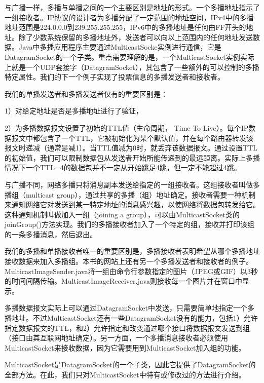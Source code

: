 		与广播一样，多播与单播之间的一个主要区别是地址的形式。一个多播地址指示了一组接收者。IP协议的设计者为多播分配了一定范围的地址空间，IPv4中的多播地址范围是224.0.0.0到239.255.255.255，IPv6中的多播地址是任何由FF开头的地址。除了少数系统保留的多播地址外，发送者可以向以上范围内的任何地址发送数据。Java中多播应用程序主要通过MulticastSocke实例进行通信，它是DatagramSocket的一个子类。重点需要理解的是，一个MulticastSocket实例实际上就是一个UDP套接字（DatagramSocket），其包含了一些额外的可以控制的多播特定属性。我们的下一个例子实现了投票信息的多播发送者和接收者。 

		

		我们的单播发送者和多播发送者仅有的重要区别是：

		1）对给定地址是否是多播地址进行了验证，

		2）为多播数据报文设置了初始的TTL值（生命周期， Time To Live）。每个IP数据报文中都包含了一个TTL，它被初始化为某个默认值，并在每个路由器转发该报文时递减（通常是减1）。当TTL值减为0时，就丢弃该数据报文。通过设置TTL的初始值，我们可以限制数据包从发送者开始所能传递到的最远距离。实际上多播情况下一个TTL=4的数据包并不一定从开始跳足4跳，但一定不能超过4跳。

		与广播不同，网络多播只将消息副本发送给指定的一组接收者。这组接收者叫做多播组（multicast group），通过共享的多播（组）地址确定。接收者需要一种机制来通知网络它对发送到某一特定地址的消息感兴趣，以使网络将数据包转发给它。这种通知机制叫做加入一组（joining a group），可以由MulticastSocket类的joinGroup()方法实现。我们的多播接收者加入了一个特定的组，接收并打印该组的一条多播消息，然后退出。 

		

		我们的多播和单播接收者唯一的重要区别是，多播接收者表明希望从哪个多播地址接收数据来加入多播组。本书的网站上还有另一个多播发送者和接收者的例子。MulticastImageSender.java将一组由命令行参数指定的图片（JPEG或GIF）以3秒的时间间隔传输。MulticastImageReceiver.java则接收每一个图片并在窗口中显示。 

		多播数据报文实际上可以通过DatagramSocket中发送，只需要简单地指定一个多播地址。不过MulticastSocket还有一些DatagramSocket没有的能力，包括1）允许指定数据报文的TTL，和2）允许指定和改变通过哪个接口将数据报文发送到组（接口由其互联网地址确定）。另一方面，一个多播消息接收者必须使用MulticastSocket来接收数据，因为它需要用到MulticastSocket加入组的功能。 

		MulticastSocket是DatagramSocket的一个子类，因此它提供了DatagramSocket的全部方法。在此，我们只对MulticastSocket中特有或修改过的方法进行介绍。 

